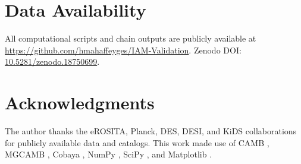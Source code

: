 \documentclass[12pt,a4paper]{article}
\begin{document}
\section*{Data Availability}

All computational scripts and chain outputs are publicly available at
\url{https://github.com/hmahaffeyges/IAM-Validation}.
Zenodo DOI: \href{https://doi.org/10.5281/zenodo.18750699}{10.5281/zenodo.18750699}.

\section*{Acknowledgments}

The author thanks the eROSITA, Planck, DES, DESI, and KiDS collaborations for publicly
available data and catalogs. This work made use of CAMB \citep{Lewis2000},
MGCAMB \citep{Zucca2019}, Cobaya \citep{Torrado2021}, NumPy \citep{Harris2020},
SciPy \citep{Virtanen2020}, and Matplotlib \citep{Hunter2007}.
\end{document}
